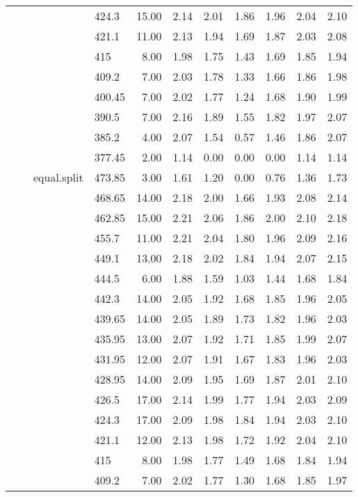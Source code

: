 \begin{longtable}{llllrrrrrrr}
   &  &  & 424.3 & 15.00 & 2.14 & 2.01 & 1.86 & 1.96 & 2.04 & 2.10 \\ 
   &  &  & 421.1 & 11.00 & 2.13 & 1.94 & 1.69 & 1.87 & 2.03 & 2.08 \\ 
   &  &  & 415 & 8.00 & 1.98 & 1.75 & 1.43 & 1.69 & 1.85 & 1.94 \\ 
   &  &  & 409.2 & 7.00 & 2.03 & 1.78 & 1.33 & 1.66 & 1.86 & 1.98 \\ 
   &  &  & 400.45 & 7.00 & 2.02 & 1.77 & 1.24 & 1.68 & 1.90 & 1.99 \\ 
   &  &  & 390.5 & 7.00 & 2.16 & 1.89 & 1.55 & 1.82 & 1.97 & 2.07 \\ 
   &  &  & 385.2 & 4.00 & 2.07 & 1.54 & 0.57 & 1.46 & 1.86 & 2.07 \\ 
   &  &  & 377.45 & 2.00 & 1.14 & 0.00 & 0.00 & 0.00 & 1.14 & 1.14 \\ 
   &  & equal.split & 473.85 & 3.00 & 1.61 & 1.20 & 0.00 & 0.76 & 1.36 & 1.73 \\ 
   &  &  & 468.65 & 14.00 & 2.18 & 2.00 & 1.66 & 1.93 & 2.08 & 2.14 \\ 
   &  &  & 462.85 & 15.00 & 2.21 & 2.06 & 1.86 & 2.00 & 2.10 & 2.18 \\ 
   &  &  & 455.7 & 11.00 & 2.21 & 2.04 & 1.80 & 1.96 & 2.09 & 2.16 \\ 
   &  &  & 449.1 & 13.00 & 2.18 & 2.02 & 1.84 & 1.94 & 2.07 & 2.15 \\ 
   &  &  & 444.5 & 6.00 & 1.88 & 1.59 & 1.03 & 1.44 & 1.68 & 1.84 \\ 
   &  &  & 442.3 & 14.00 & 2.05 & 1.92 & 1.68 & 1.85 & 1.96 & 2.05 \\ 
   &  &  & 439.65 & 14.00 & 2.05 & 1.89 & 1.73 & 1.82 & 1.96 & 2.03 \\ 
   &  &  & 435.95 & 13.00 & 2.07 & 1.92 & 1.71 & 1.85 & 1.99 & 2.07 \\ 
   &  &  & 431.95 & 12.00 & 2.07 & 1.91 & 1.67 & 1.83 & 1.96 & 2.03 \\ 
   &  &  & 428.95 & 14.00 & 2.09 & 1.95 & 1.69 & 1.87 & 2.01 & 2.10 \\ 
   &  &  & 426.5 & 17.00 & 2.14 & 1.99 & 1.77 & 1.94 & 2.03 & 2.09 \\ 
   &  &  & 424.3 & 17.00 & 2.09 & 1.98 & 1.84 & 1.94 & 2.03 & 2.10 \\ 
   &  &  & 421.1 & 12.00 & 2.13 & 1.98 & 1.72 & 1.92 & 2.04 & 2.10 \\ 
   &  &  & 415 & 8.00 & 1.98 & 1.77 & 1.49 & 1.68 & 1.84 & 1.94 \\ 
   &  &  & 409.2 & 7.00 & 2.02 & 1.77 & 1.30 & 1.68 & 1.85 & 1.97 \\ 

\end{longtable}
